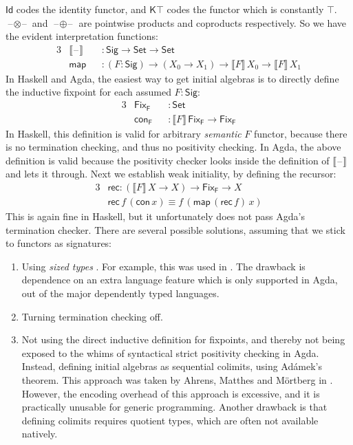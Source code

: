 \documentclass[12pt,a4paper,twoside,openany]{book}
\theoremstyle{remark}
\theoremstyle{definition}
\newcommand{\ms}[1]{\mathsf{#1}}
\newcommand{\blank}{\mathord{\hspace{1pt}\text{--}\hspace{1pt}}}
\newcommand{\Set}{\mathsf{Set}}
\begin{document}
$\ms{Id}$ codes the identity functor, and $\ms{K\top}$ codes the functor which
is constantly $\top$. $\blank\!\otimes\!\blank$ and $\blank\!\oplus\!\blank$ are
pointwise products and coproducts respectively. So we have the evident
interpretation functions:
\begin{alignat*}{3}
  & \llbracket\blank\rrbracket &&: \ms{Sig} \to \Set \to \Set\\
  & \ms{map} &&: (F : \ms{Sig}) \to (X_0 \to X_1) \to \llbracket F \rrbracket\,X_0 \to \llbracket F \rrbracket\,X_1
\end{alignat*}
In Haskell and Agda, the easiest way to get initial algebras is to directly define
the inductive fixpoint for each assumed $F : \ms{Sig}$:
\begin{alignat*}{3}
  & \ms{Fix_F} &&: \Set \\
  & \ms{con_F} &&: \llbracket F \rrbracket\,\ms{Fix_F} \to \ms{Fix_F}
\end{alignat*}
In Haskell, this definition is valid for arbitrary \emph{semantic} $F$ functor,
because there is no termination checking, and thus no positivity checking. In
Agda, the above definition is valid because the positivity checker looks inside
the definition of $\llbracket\blank\rrbracket$ and lets it through. Next we establish
weak initiality, by defining the recursor:
\begin{alignat*}{3}
  & \ms{rec} : (\llbracket F \rrbracket\,X \to X) \to \ms{Fix_F} \to X \\
  & \ms{rec}\,f\,(\ms{con}\,x) \equiv f\,(\ms{map}\,(\ms{rec}\,f)\,x)
\end{alignat*}
This is again fine in Haskell, but it unfortunately does not pass Agda's
termination checker. There are several possible solutions, assuming that we
stick to functors as signatures:
\begin{enumerate}
  \item Using \emph{sized types} \cite{abel17normalization}. For example, this
    was used in \cite{allais20type}. The drawback is dependence on an extra
    language feature which is only supported in Agda, out of the major
    dependently typed languages.
  \item Turning termination checking off.
  \item Not using the direct inductive definition for fixpoints, and thereby not
    being exposed to the whims of syntactical strict positivity checking in
    Agda. Instead, defining initial algebras as sequential colimits, using
    Adámek's theorem. This approach was taken by Ahrens, Matthes and Mörtberg in
    \cite{ahrens19from}. However, the encoding overhead of this approach is excessive, and
    it is practically unusable for generic programming. Another drawback is that
    defining colimits requires quotient types, which are often not available natively.
\end{enumerate}
\end{document}
